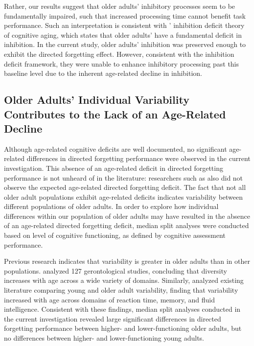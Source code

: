 \documentclass[man]{apa6}
\begin{document}
Rather, our results suggest that older adults’ inhibitory processes seem to be fundamentally impaired, such that increased processing time cannot benefit task performance. Such an interpretation is consistent with \textcite{hasher.zacks1988}' inhibition deficit theory of cognitive aging, which states that older adults’ have a fundamental deficit in inhibition. In the current study, older adults’ inhibition was preserved enough to exhibit the directed forgetting effect. However, consistent with the inhibition deficit framework, they were unable to enhance inhibitory processing past this baseline level due to the inherent age-related decline in inhibition.

\subsection*{Older Adults’ Individual Variability Contributes to the Lack of an Age-Related Decline}

Although age-related cognitive deficits are well documented, no significant age-related differences in directed forgetting performance were observed in the current investigation. This absence of an age-related deficit in directed forgetting performance is not unheard of in the literature: researchers such as \textcite{gamboz.russo2002} also did not observe the expected age-related directed forgetting deficit. The fact that not all older adult populations exhibit age-related deficits indicates variability between different populations of older adults. In order to explore how individual differences within our population of older adults may have resulted in the absence of an age-related directed forgetting deficit, median split analyses were conducted based on level of cognitive functioning, as defined by cognitive assessment performance.

Previous research indicates that variability is greater in older adults than in other populations. \textcite{nelson.dannefer1992} analyzed 127 gerontological studies, concluding that diversity increases with age across a wide variety of domains. Similarly, \textcite{morse1993} analyzed existing literature comparing young and older adult variability, finding that variability increased with age across domains of reaction time, memory, and fluid intelligence. Consistent with these findings, median split analyses conducted in the current investigation revealed large significant differences in directed forgetting performance between higher- and lower-functioning older adults, but no differences between higher- and lower-functioning young adults.
\end{document}
